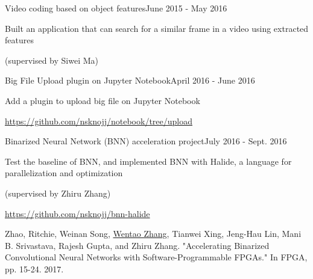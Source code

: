 \documentclass{joel_cv}
\begin{document}
\begin{sectionContentSimple}{Video coding based on object features}{June 2015 - May 2016}
\item Built an application that can search for a similar frame in a video using extracted features
\item (supervised by Siwei Ma)
\end{sectionContentSimple}

\begin{sectionContentSimple}{Big File Upload plugin on Jupyter Notebook}{April 2016 - June 2016}
\item Add a plugin to upload big file on Jupyter Notebook
\item \url{https://github.com/nsknojj/notebook/tree/upload}
\end{sectionContentSimple}

\begin{sectionContentSimple}{Binarized Neural Network (BNN) acceleration project}{July 2016 - Sept. 2016}
\item Test the baseline of BNN, and implemented BNN with Halide, a language for parallelization and optimization
\item (supervised by Zhiru Zhang)
\item \url{https://github.com/nsknojj/bnn-halide}
\end{sectionContentSimple}

%
%

\begin{sectionContentNaive}

\item Zhao, Ritchie, Weinan Song, \underline{Wentao Zhang}, Tianwei Xing, Jeng-Hau Lin, Mani B. Srivastava, Rajesh Gupta, and Zhiru Zhang. "Accelerating Binarized Convolutional Neural Networks with Software-Programmable FPGAs." In FPGA, pp. 15-24. 2017.

\end{sectionContentNaive}
\end{document}
